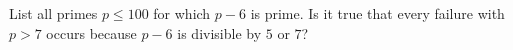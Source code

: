 List all primes $p\le100$ for which $p-6$ is prime. Is it true that every failure with $p>7$ occurs because $p-6$ is divisible by $5$ or $7$?
